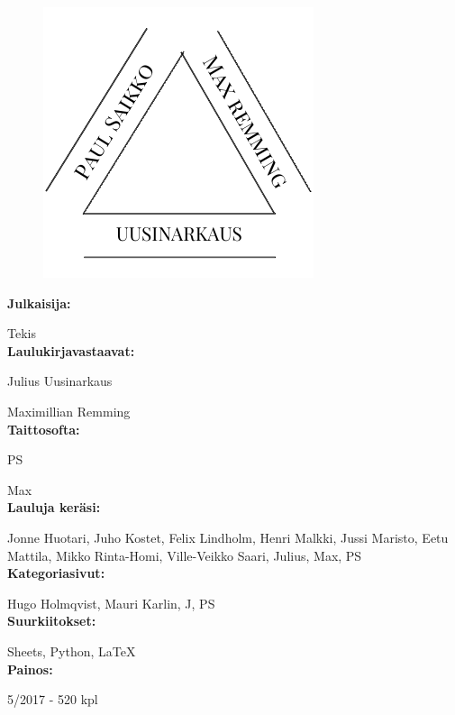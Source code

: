 


\newpage
\begin{figure}[t]
\includegraphics[scale=0.82]{graphics/tekijat.pdf}
\centering
\end{figure}

\textbf{Julkaisija:}

Tekis
\\


\textbf{Laulukirjavastaavat:}

Julius Uusinarkaus

Maximillian Remming
\\

\textbf{Taittosofta:}

PS

Max
\\

\textbf{Lauluja keräsi:}

Jonne Huotari, Juho Kostet, Felix Lindholm, Henri Malkki, Jussi Maristo, Eetu Mattila, Mikko Rinta-Homi, Ville-Veikko Saari, Julius, Max, PS
\\

\textbf{Kategoriasivut:}

Hugo Holmqvist, Mauri Karlin, J, PS
\\

\textbf{Suurkiitokset:}

Sheets, Python, \LaTeX
\\

\textbf{Painos:}

5/2017 - 520 kpl

\newpage

